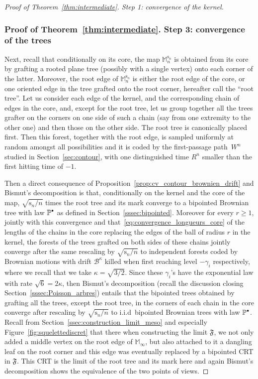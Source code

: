 \documentclass[11pt]{article}
\newcommand{\sbullet}{{\raisebox{1pt}{$\scriptscriptstyle\bullet $}}}
\theoremstyle{plain}
\theoremstyle{definition}
\theoremstyle{remark}
\renewcommand{\P}{\mathbb{P}}
\newcommand{\Mapb}{\mathbb{M}}
\newcommand{\spar}{\mathrm{s}}
\begin{document}
\begin{proof}[Proof of Theorem~\ref{thm:intermediate}. Step 1: convergence of the kernel]
\subsubsection*{Proof of Theorem~\ref{thm:intermediate}. Step 3: convergence of the trees}
Next, recall that conditionally on its core, the map $\Mapb_n^{\spar_n}$ is obtained from its core by grafting a rooted plane tree (possibly with a single vertex) onto each corner of the latter. Moreover, the root edge of $\Mapb_n^{\spar_n}$ is either the root edge of the core, or one oriented edge in the tree grafted onto the root corner, hereafter call the ``root tree''.
Let us consider each edge of the kernel, and the corresponding chain of edges in the core, and, except for the root tree, let us group together all the trees grafter on the corners on one side of such a chain (say from one extremity to the other one) and then those on the other side. The root tree is canonically placed first.
Then this forest, together with the root edge, is sampled uniformly at random amongst all possibilities and it is coded by the first-passage path~$W^n$ studied in Section~\ref{sec:contour}, with one distinguished time $R^n$ smaller than the first hitting time of $-1$.

Then a direct consequence of Proposition~\ref{prop:cv_contour_brownien_drift} and Bismut's decomposition is that, conditionally on the kernel and the core of the map, $\sqrt{\spar_n/n}$ times the root tree and its mark converge to a bipointed Brownian tree with law $ \P^{\sbullet}$ as defined in Section~\ref{sssec:bipointed}. Moreover for every $r \ge 1$, jointly with this convergence and that~\eqref{eq:convergence_longueurs_core} of the lengths of the chains in the core replacing the edges of the ball of radius $r$ in the kernel, the forests of the trees grafted on both sides of these chains jointly converge after the same rescaling by $\sqrt{\spar_n/n}$ to independent forests coded by Brownian motions with drift $\mathcal{B}^\kappa$ killed when first reaching level $-\gamma_i$ respectively, where we recall that we take $\kappa = \sqrt{3/2}$. Since these $\gamma_i$'s have the exponential law with rate $\sqrt{6} = 2\kappa$, then Bismut's decomposition (recall the discussion closing Section~\ref{sssec:Poisson_arbres}) entails that the bipointed trees obtained by grafting all the trees, except the root tree, in the corners of each chain in the core converge after rescaling by $\sqrt{\spar_n/n}$ to i.i.d~bipointed Brownian trees with law $ \P^{\sbullet}$.
Recall from Section~\ref{ssec:construction_limit_meso} and especially Figure~\ref{fig:squelettediscret} that there when constructing the limit $\mathfrak{F}$, we not only added a middle vertex on the root edge of $\Mapb_\infty$, but also attached to it a dangling leaf on the root corner and this edge was eventually replaced by a bipointed CRT in $\mathfrak{F}$. This CRT is the limit of the root tree and its mark here and again Bismut's decomposition shows the equivalence of the two points of views.


\end{proof}
\end{document}
